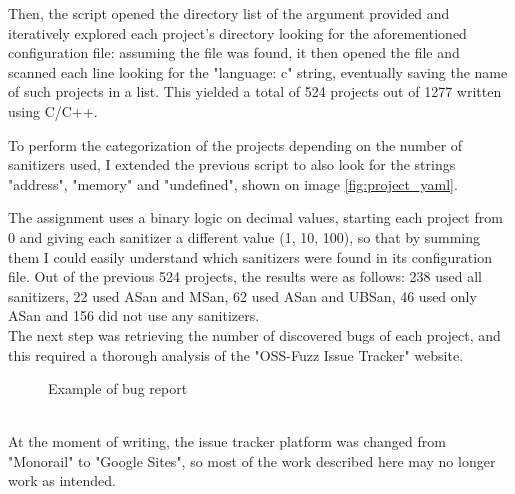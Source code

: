 Then, the script opened the directory list of the argument provided and iteratively explored each project's directory looking for the aforementioned configuration file: assuming the file was found, it then opened the file and scanned each line looking for the "language: c" string, eventually saving the name of such projects in a list.
This yielded a total of 524 projects out of 1277 written using C/C++.

To perform the categorization of the projects depending on the number of sanitizers used, I extended the previous script to also look for the strings "address", "memory" and "undefined", shown on image \ref{fig:project_yaml}.

The assignment uses a binary logic on decimal values, starting each project from 0 and giving each sanitizer a different value (1, 10, 100), so that by summing them I could easily understand which sanitizers were found in its configuration file.
Out of the previous 524 projects, the results were as follows: 238 used all sanitizers, 22 used ASan and MSan, 62 used ASan and UBSan, 46 used only ASan and 156 did not use any sanitizers.
\ \\ 
 

The next step was retrieving the number of discovered bugs of each project, and this required a thorough analysis of the "OSS-Fuzz Issue Tracker" website. \cite{ossfuzz_bugtracker}

\begin{figure}[h]
\caption{Example of bug report \cite{ossfuzz_bugtracker}}
\label{fig:issue}
\end{figure}
\ \\
At the moment of writing, the issue tracker platform was changed from "Monorail" to "Google Sites", so most of the work described here may no longer work as intended.




